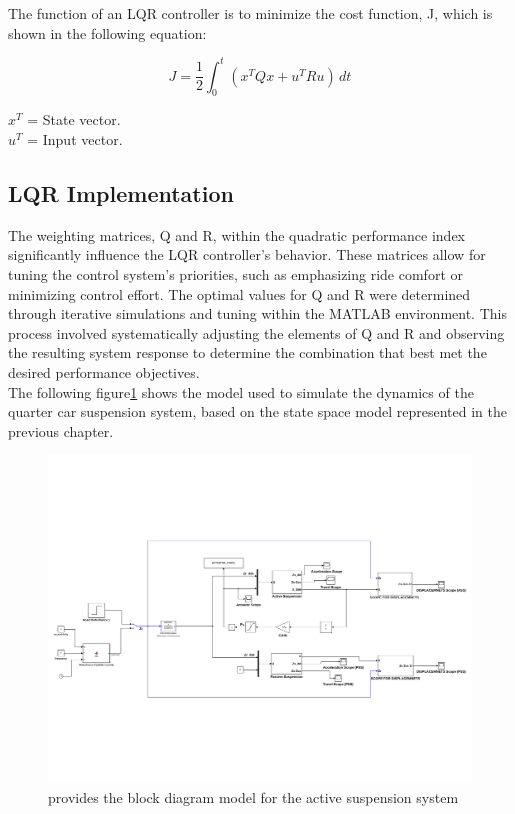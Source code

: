 The function of an LQR controller is to minimize the cost function, J, which is shown in the following equation:

\begin{equation}
	J = \frac{1}{2} \int_{0}^{t} (x^{T}Qx + u^{T}Ru) \, dt 
\end{equation}

$x^{T}$ = State vector.\\

$u^{T}$ = Input vector.

\subsection{LQR Implementation}
The weighting matrices, Q and R, within the quadratic performance index significantly influence the LQR controller's behavior. These matrices allow for tuning the control system's priorities, such as emphasizing ride comfort or minimizing control effort. The optimal values for Q and R were determined through iterative simulations and tuning within the MATLAB environment. This process involved systematically adjusting the elements of Q and R and observing the resulting system response to determine the combination that best met the desired performance objectives.\\ 

The following figure\ref{fig:lqr-final} shows the model used to simulate the dynamics of the quarter car suspension system, based on the state space model represented in the previous chapter. 

        \begin{figure}[H]
	\centering
	\includegraphics[trim=0cm 5cm 0cm 5cm, clip, width=1\linewidth]{figures/lqr-final.pdf}
	\caption{provides the block diagram model for the active suspension system}
	\label{fig:lqr-final}
\end{figure}

